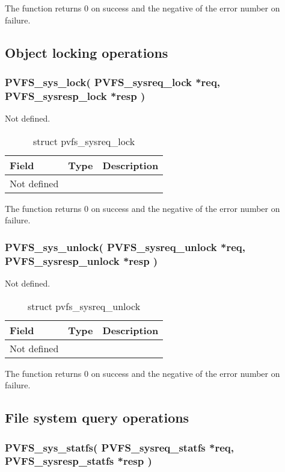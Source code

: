 \documentclass[11pt, letterpaper]{article}
\begin{document}
The function returns 0 on success and the negative of the error
number on failure.

\subsection{Object locking operations}

\subsubsection{PVFS\_sys\_lock(
PVFS\_sysreq\_lock *req,
PVFS\_sysresp\_lock *resp
)}

Not defined.

\begin{table}[H]
\begin{tabular}{|l|l|l|}
\hline
Field & Type & Description \\
\hline
\hline
Not defined & & \\
\hline
\end{tabular}
\caption{struct pvfs\_sysreq\_lock}\label{tab:reqlock}
\end{table}

The function returns 0 on success and the negative of the error
number on failure.

\subsubsection{PVFS\_sys\_unlock(
PVFS\_sysreq\_unlock *req,
PVFS\_sysresp\_unlock *resp
)}

Not defined.

\begin{table}[H]
\begin{tabular}{|l|l|l|}
\hline
Field & Type & Description \\
\hline
\hline
Not defined & & \\
\hline
\end{tabular}
\caption{struct pvfs\_sysreq\_unlock}\label{tab:requnlock}
\end{table}

The function returns 0 on success and the negative of the error
number on failure.

\subsection{File system query operations}

\subsubsection{PVFS\_sys\_statfs(
PVFS\_sysreq\_statfs *req,
PVFS\_sysresp\_statfs *resp
)}
\end{document}
